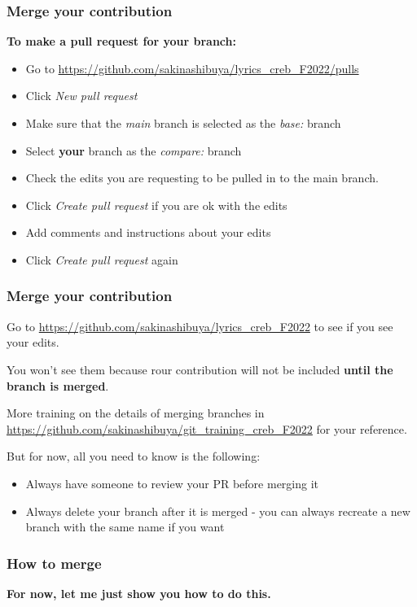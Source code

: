 \documentclass[aspectratio=169]{beamer} %
\newcommand{\trainingURL}[1]{{\color{blue}\url{#1}}}
\newcommand{\traininerUsername}{sakinashibuya}
\newcommand{\repoName}{\traininerUsername/lyrics_creb_F2022}
\newcommand{\trainingRepoURL}[1]{\trainingURL{https://github.com/\repoName #1}}
\begin{document}
\begin{frame}
\frametitle{Merge your contribution}

	\textbf{To make a pull request for your branch:}
	\begin{itemize}
		\item Go to \trainingRepoURL{/pulls}
		\item Click \textit{New pull request}
		\item Make sure that the \textit{main} branch is selected as the \textit{base:} branch
		\item Select \textbf{your} branch as the \textit{compare:} branch
		\item Check the edits you are requesting to be pulled in to the main branch. 
		\item Click \textit{Create pull request} if you are ok with the edits
		\item Add comments and instructions about your edits
		\item Click \textit{Create pull request} again
	\end{itemize}
\end{frame}

\begin{frame}
\frametitle{Merge your contribution}

Go to \trainingRepoURL{} to see if you see your edits.

You won't see them because rour contribution will not be included \textbf{until the branch is merged}. 

More training on the details of merging branches in \textcolor{blue}{\url{https://github.com/sakinashibuya/git_training_creb_F2022}} for your reference.

But for now, all you need to know is the following:
	\begin{itemize}
		\item Always have someone to review your PR before merging it
		\item Always delete your branch after it is merged - you can always recreate a new branch with the same name if you want
	\end{itemize}

\end{frame}

\begin{frame}
	\frametitle{How to merge}
	
	\vspace{3cm}
	
	\textbf{For now, let me just show you how to do this.}
	
	\vspace{3cm}
\end{frame}
\end{document}
